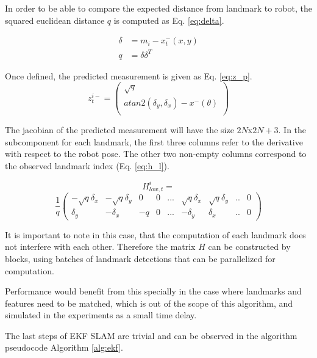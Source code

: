 \documentclass[conference]{IEEEtran}
\begin{document}
In order to be able to compare the expected distance from landmark to robot, the squared euclidean distance $q$ is computed as Eq. \ref{eq:delta}.

\begin{equation} \label{eq:delta}
    \begin{aligned}
    \delta & = m_i - x_t^-(x, y) \\
    q & = \delta \delta^T
    \end{aligned}
\end{equation}

Once defined, the predicted measurement is given as Eq. \ref{eq:z_p}.   
\begin{equation} \label{eq:z_p}
    z_t^{i-} = \begin{pmatrix}
    \sqrt{q} \\
    atan2(\delta_y, \delta_x) - x^-(\theta) \\
    \end{pmatrix}
\end{equation}

The jacobian of the predicted measurement will have the size $2N $x$ 2N + 3$. In the subcomponent for each landmark, the first three columns refer to the derivative with respect to the robot pose. The other two non-empty columns correspond to the observed landmark index (Eq. \ref{eq:h_l}).

$$H_{low, t}^i  = $$
\begin{equation} \label{eq:h_l}
\frac{1}{q} 
\begin{pmatrix}
-\sqrt{q} \delta_x & -\sqrt{q} \delta_y & 0 & 0 & ... & \sqrt{q} \delta_x & \sqrt{q} \delta_y  & .. & 0\\
\delta_y & -\delta_x & -q & 0 & ... & -\delta_y & \delta_x & .. & 0
\end{pmatrix}
\end{equation}

It is important to note in this case, that the computation of each landmark does not interfere with each other. Therefore the matrix $H$ can be constructed by blocks, using batches of landmark detections that can be parallelized for computation. 

Performance would benefit from this specially in the case where landmarks and features need to be matched, which is out of the scope of this algorithm, and simulated in the experiments as a small time delay.

The last steps of EKF SLAM are trivial and can be observed in the algorithm pseudocode Algorithm \ref{alg:ekf}.
\end{document}
